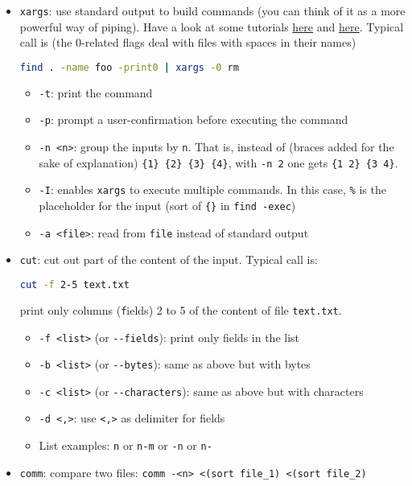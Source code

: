\documentclass[a4paper,12pt,%
              final%
              ]{article}
\begin{document}
\begin{itemize}
\begin{itemize}
    \end{itemize}
  \item \texttt{xargs}: use standard output to build commands (you can think of it as a more powerful way of piping). Have a look at some tutorials \href{https://shapeshed.com/unix-xargs/}{here} and \href{https://www.thegeekstuff.com/2013/12/xargs-examples/}{here}. Typical call is (the 0-related flags deal with files with spaces in their names)
\begin{lstlisting}[language=bash]
find . -name foo -print0 | xargs -0 rm
\end{lstlisting}
    \begin{itemize}
      \item \texttt{-t}: print the command
      \item \texttt{-p}: prompt a user-confirmation before executing the command
      \item \texttt{-n <n>}: group the inputs by \texttt{n}. That is, instead of (braces added for the sake of explanation) \verb|{1} {2} {3} {4}|, with \texttt{-n 2} one gets \verb|{1 2} {3 4}|.
      \item \texttt{-I}: enables \texttt{xargs} to execute multiple commands. In this case, \verb|%| is the placeholder for the input (sort of \verb|{}| in \verb|find -exec|)
      \item \texttt{-a <file>}: read from \texttt{file} instead of standard output
    \end{itemize}
  \item \texttt{cut}: cut out part of the content of the input. Typical call is:
\begin{lstlisting}[language=bash]
cut -f 2-5 text.txt
\end{lstlisting}
    print only columns (\texttt{f}ields) 2 to 5 of the content of file \verb|text.txt|.
    \begin{itemize}
      \item \verb|-f <list>| (or \verb|--fields|): print only fields in the list
      \item \verb|-b <list>| (or \verb|--bytes|): same as above but with bytes
      \item \verb|-c <list>| (or \verb|--characters|): same as above but with characters
      \item \verb|-d <,>|: use \verb|<,>| as delimiter for fields
      \item List examples: \texttt{n} or \texttt{n-m} or \texttt{-n} or \texttt{n-}
    \end{itemize}
  \item \texttt{comm}: compare two files: \verb|comm -<n> <(sort file_1) <(sort file_2)|

\end{itemize}
\end{document}
